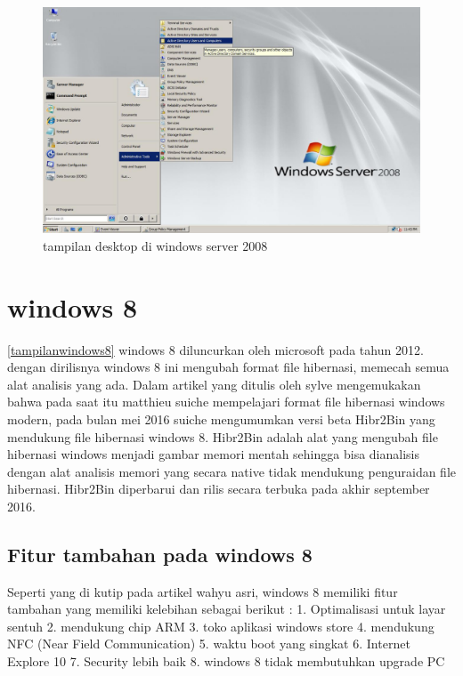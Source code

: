 \begin{figure}[ht]
\centerline{\includegraphics[width=1\textwidth]{figures/windowsserver2008.JPG}}
\caption{tampilan desktop di windows server 2008}
\label{windowsserver2008}
\end{figure}
	\section{windows 8}
		\ref{tampilanwindows8} windows 8 diluncurkan oleh microsoft pada tahun 2012. dengan dirilisnya windows 8 ini mengubah format file hibernasi, memecah semua alat analisis yang ada.
		Dalam artikel yang ditulis oleh sylve mengemukakan bahwa pada saat itu matthieu suiche mempelajari format file hibernasi windows modern, pada bulan mei 2016 suiche mengumumkan versi beta Hibr2Bin yang mendukung file hibernasi windows 8. Hibr2Bin adalah alat yang mengubah file hibernasi windows menjadi gambar memori mentah sehingga bisa dianalisis dengan alat analisis memori yang secara native tidak mendukung penguraidan file hibernasi. Hibr2Bin diperbarui dan rilis secara terbuka pada akhir september 2016. \cite{sylve2017modern}
		\subsection{Fitur tambahan pada windows 8}
			Seperti yang di kutip pada artikel wahyu asri, windows 8 memiliki fitur tambahan yang memiliki kelebihan sebagai berikut :
			1. Optimalisasi untuk layar sentuh
			2. mendukung chip ARM
			3. toko aplikasi windows store
			4. mendukung NFC (Near Field Communication)
			5. waktu boot yang singkat
			6. Internet Explore 10
			7. Security lebih baik
			8. windows 8 tidak membutuhkan upgrade PC \cite{wahyu8review}

